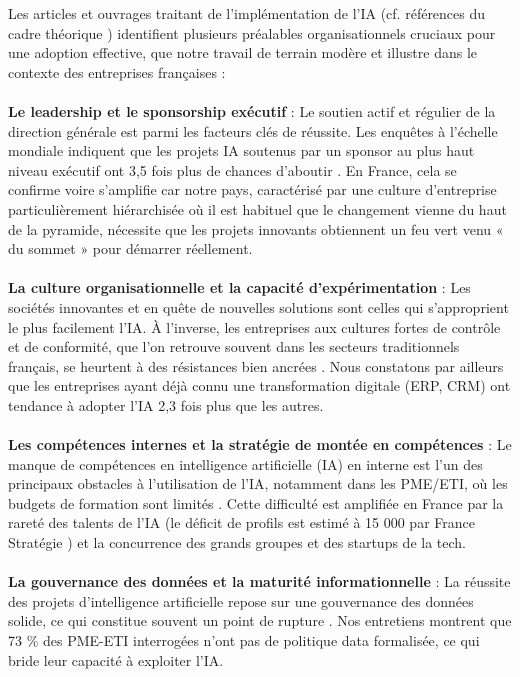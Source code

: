 Les articles et ouvrages traitant de l'implémentation de l'IA (cf. références du cadre théorique \cite{davis1989perceived, artimon2025theorie, psicosmart2024resistance, vorecol2024resistance, chen2024airam}) identifient plusieurs préalables organisationnels cruciaux pour une adoption effective, que notre travail de terrain modère et illustre dans le contexte des entreprises françaises :
\\\\
\textbf{Le leadership et le sponsorship exécutif} : Le soutien actif et régulier de la direction générale est parmi les facteurs clés de réussite. Les enquêtes à l’échelle mondiale indiquent que les projets IA soutenus par un sponsor au plus haut niveau exécutif ont 3,5 fois plus de chances d’aboutir \cite{capgemini2024ai_france}. En France, cela se confirme voire s’amplifie car notre pays, caractérisé par une culture d’entreprise particulièrement hiérarchisée où il est habituel que le changement vienne du haut de la pyramide, nécessite que les projets innovants obtiennent un feu vert venu « du sommet » pour démarrer réellement.
\\\\
\textbf{La culture organisationnelle et la capacité d'expérimentation} : Les sociétés innovantes et en quête de nouvelles solutions sont celles qui s’approprient le plus facilement l’IA. À l’inverse, les entreprises aux cultures fortes de contrôle et de conformité, que l’on retrouve souvent dans les secteurs traditionnels français, se heurtent à des résistances bien ancrées \cite{teece2007dynamic}. Nous constatons par ailleurs que les entreprises ayant déjà connu une transformation digitale (ERP, CRM) ont tendance à adopter l’IA 2,3 fois plus que les autres.
\\\\
\textbf{Les compétences internes et la stratégie de montée en compétences} : Le manque de compétences en intelligence artificielle (IA) en interne est l'un des principaux obstacles à l'utilisation de l'IA, notamment dans les PME/ETI, où les budgets de formation sont limités \cite{bpifrance2025ia}. Cette difficulté est amplifiée en France par la rareté des talents de l'IA (le déficit de profils est estimé à 15 000 par France Stratégie \cite{france_strategie2025make}) et la concurrence des grands groupes et des startups de la tech.
\\\\
\textbf{La gouvernance des données et la maturité informationnelle} : La réussite des projets d’intelligence artificielle repose sur une gouvernance des données solide, ce qui constitue souvent un point de rupture \cite{wang2024data_governance}. Nos entretiens montrent que 73 \% des PME-ETI interrogées n’ont pas de politique data formalisée, ce qui bride leur capacité à exploiter l’IA.
